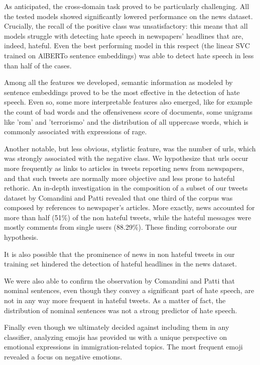 As anticipated, the cross-domain task proved to be particularly challenging.
All the tested models showed significantly lowered performance on the news dataset.
Crucially, the recall of the positive class was unsatisfactory: this means that all models struggle with detecting hate speech in newspapers' headlines that are, indeed, hateful.
Even the best performing model in this respect (the linear SVC trained on AlBERTo sentence embeddings) was able to detect hate speech in less than half of the cases.

Among all the features we developed, semantic information as modeled by sentence embeddings proved to be the most effective in the detection of hate speech.
Even so, some more interpretable features also emerged, like for example the count of bad words and the offensiveness score of documents, some unigrams like 'rom' and 'terrorismo' and the distribution of all uppercase words, which is commonly associated with expressions of rage.

Another notable, but less obvious, stylistic feature, was the number of urls, which was strongly associated with the negative class.
We hypothesize that urls occur more frequently as links to articles in tweets reporting news from newspapers, and that such tweets are normally more objective and less prone to hateful rethoric.
An in-depth investigation in the composition of a subset of our tweets dataset by Comandini and Patti \cite{comandini_nominal_utterances} revealed that one third of the corpus was composed by references to newspaper's articles.
More exactly, news accounted for more than half (51\%) of the non hateful tweets, while the hateful messages were mostly comments from single users (88.29\%). These finding corroborate our hypothesis.

It is also possible that the prominence of news in non hateful tweets in our training set hindered the detection of hateful headlines in the news dataset.

We were also able to confirm the observation by Comandini and Patti that nominal sentences, even though they convey a significant part of hate speech, are not in any way more frequent in hateful tweets.
As a matter of fact, the distribution of nominal sentences was not a strong predictor of hate speech.

Finally even though we ultimately decided against including them in any classifier, analyzing emojis has provided us with a unique perspective on emotional expressions in immigration-related topics. The most frequent emoji revealed a focus on negative emotions.
